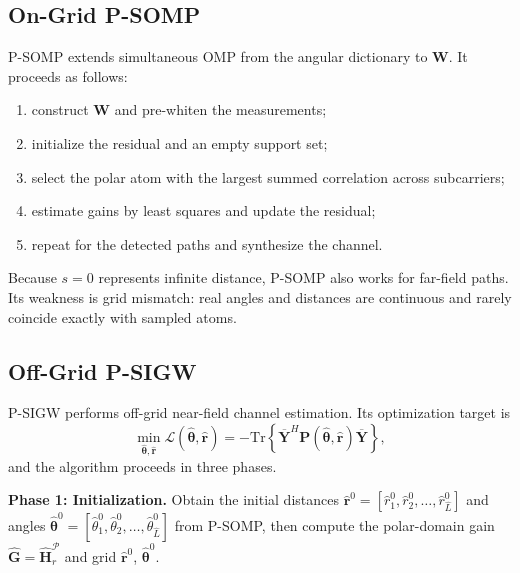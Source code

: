 \documentclass[12pt,a4paper]{article}
\newcommand{\fieldvec}[1]{\boldsymbol{#1}}
\begin{document}
\subsection{On-Grid P-SOMP}

P-SOMP extends simultaneous OMP from the angular dictionary to
$\fieldvec{W}$. It proceeds as follows:
\begin{enumerate}
  \item construct $\fieldvec{W}$ and pre-whiten the measurements;
  \item initialize the residual and an empty support set;
  \item select the polar atom with the largest summed correlation across
  subcarriers;
  \item estimate gains by least squares and update the residual;
  \item repeat for the detected paths and synthesize the channel.
\end{enumerate}
Because $s=0$ represents infinite distance, P-SOMP also works for
far-field paths. Its weakness is grid mismatch: real angles and distances
are continuous and rarely coincide exactly with sampled atoms.

\subsection{Off-Grid P-SIGW}

P-SIGW performs off-grid near-field channel estimation. Its optimization
target is
\begin{equation}
  \min_{\hat{\fieldvec{\theta}},\hat{\fieldvec{r}}}
  \mathcal{L}(\hat{\fieldvec{\theta}},\hat{\fieldvec{r}})
  =-\mathrm{Tr}\!\left\{
  \overline{\fieldvec{Y}}^{H}
  \fieldvec{P}(\hat{\fieldvec{\theta}},\hat{\fieldvec{r}})
  \overline{\fieldvec{Y}}\right\},
  \label{eq:psigw}
\end{equation}
and the algorithm proceeds in three phases.

\textbf{Phase 1: Initialization.}
Obtain the initial distances
$\hat{\fieldvec{r}}^{0}=[\hat{r}_1^0,\hat{r}_2^0,\ldots,\hat{r}_{\hat{L}}^0]$
and angles
$\hat{\fieldvec{\theta}}^{0}=[\hat{\theta}_1^0,\hat{\theta}_2^0,\ldots,\hat{\theta}_{\hat{L}}^0]$
from P-SOMP, then compute the polar-domain gain
$\hat{\fieldvec{G}}=\hat{\fieldvec{H}}_r^{\mathcal{P}}$ and grid
$\hat{\fieldvec{r}}^{0}$, $\hat{\fieldvec{\theta}}^{0}$.
\end{document}
